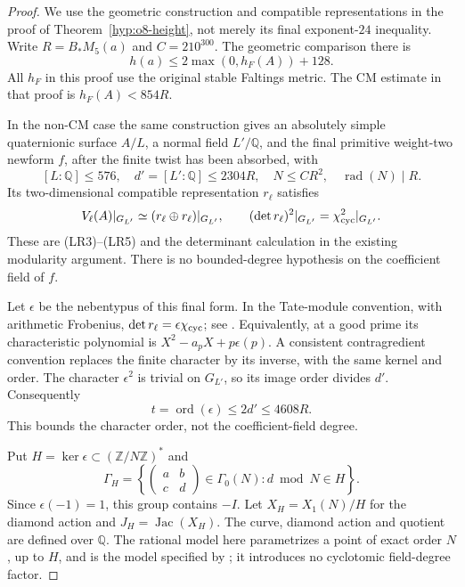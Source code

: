 \documentclass[11pt]{article}
\theoremstyle{definition}
\theoremstyle{remark}
\begin{document}
\begin{proof}
We use the geometric construction and compatible representations in the
proof of Theorem~\ref{hyp:o8-height}, not merely its final exponent-$24$
inequality. Write $R=B_*M_5(a)$ and $C=210^{300}$.
The geometric comparison there is
\[
 h(a)\le2\max(0,h_F(A))+128.
\]
All $h_F$ in this proof use the original stable Faltings metric.
The CM estimate in that proof is $h_F(A)<854R$.

In the non-CM case the same construction gives an absolutely simple
quaternionic surface $A/L$, a normal field $L'/\mathbb Q$, and the final
primitive weight-two newform $f$, after the finite twist has been
absorbed, with
\[
 [L:\mathbb Q]\le576,\quad d'=[L':\mathbb Q]\le2304R,\quad
 N\le CR^2,\quad \operatorname{rad}(N)\mid R.
\]
Its two-dimensional compatible representation $r_\ell$ satisfies
\[
 V_\ell(A)|_{G_{L'}}\simeq
       (r_\ell\oplus r_\ell)|_{G_{L'}},\qquad
 (\det r_\ell)^2|_{G_{L'}}=\chi_{\rm cyc}^2|_{G_{L'}}.
\]
These are (LR3)--(LR5) and the determinant calculation in the existing
modularity argument. There is no bounded-degree hypothesis on the
coefficient field of $f$.

Let $\epsilon$ be the nebentypus of this final form. In the Tate-module
convention, with arithmetic Frobenius, $\det r_\ell=\epsilon\chi_{\rm cyc}$;
see \cite[\S12.5, (12.5.1)--(12.5.2) and Remark 12.5.1,
pp.~119--120]{diamond-im}. Equivalently, at a good prime its
characteristic polynomial is $X^2-a_pX+p\epsilon(p)$.
A consistent contragredient convention replaces the finite character by
its inverse, with the same kernel and order. The character $\epsilon^2$
is trivial on $G_{L'}$, so its image order divides $d'$. Consequently
\[
 t=\operatorname{ord}(\epsilon)\le2d'\le4608R.
\]
This bounds the character order, not the coefficient-field degree.

Put $H=\ker\epsilon\subset(\mathbb Z/N\mathbb Z)^*$ and
\[
 \Gamma_H=\left\{
 \begin{pmatrix}a&b\\c&d\end{pmatrix}\in\Gamma_0(N):
 d\bmod N\in H\right\}.
\]
Since $\epsilon(-1)=1$, this group contains $-I$.
Let $X_H=X_1(N)/H$ for the diamond action and $J_H=\operatorname{Jac}(X_H)$.
The curve, diamond action and quotient are defined over $\mathbb Q$.
The rational model here parametrizes a point of exact order $N$, up to
$H$, and is the model specified by \cite[\S2.1, (2.1.8)]{mascot-moduli};
it introduces no cyclotomic field-degree factor.


\end{proof}
\end{document}
